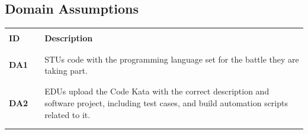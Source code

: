 \subsection{Domain Assumptions}
\begin{table}[H]
    \centering
    \renewcommand{\arraystretch}{0.5}
    \begin{tabular}{l l p{10.5cm}}
        \hline
                     &        &                                                                                                                                                                                                                                               \\
        \textbf{ID}  & \vline & \textbf{Description}                                                                                                                                                                                                                          \\
                     &        &                                                                                                                                                                                                                                               \\\hline & & \\
        \textbf{DA1} & \vline & STUs code with the programming language set for the battle they are taking part.                                                                                                                                                              \\
                     &        &                                                                                                                                                                                                                                               \\\hline & & \\
        \textbf{DA2} & \vline & EDUs upload the Code Kata with the correct description and software project, including test cases, and build automation scripts related to it.                                                                                                \\
                     &        &                                                                                                                                                                                                                                               \\\hline & & \\

\end{tabular}
\end{table}
